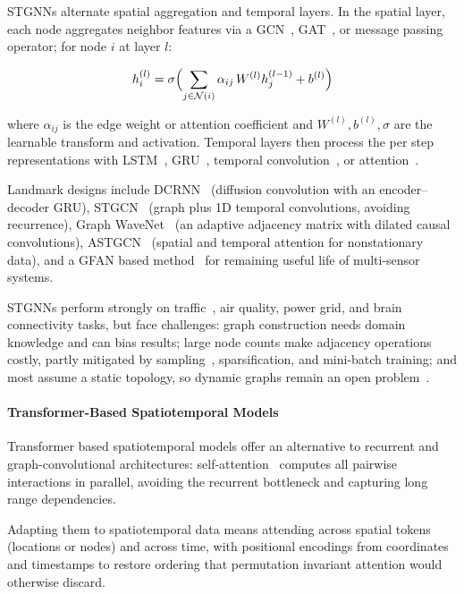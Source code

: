 \documentclass[journal]{IEEEtran}
\begin{document}
STGNNs alternate spatial aggregation and temporal layers. In the spatial layer, each node aggregates neighbor features via a GCN~\cite{kipf2017gcn}, GAT~\cite{velickovic2018gat}, or message passing operator; for node $i$ at layer $l$:
 
\begin{equation}
h_i^{(l)} = \sigma \Bigl( \sum_{j \in \mathcal{N}(i)} \alpha_{ij} \, W^{(l)} h_j^{(l-1)} + b^{(l)} \Bigr)
\end{equation}
 
where $\alpha_{ij}$ is the edge weight or attention coefficient and $W^{(l)},b^{(l)},\sigma$ are the learnable transform and activation. Temporal layers then process the per step representations with LSTM~\cite{rnn_lstm}, GRU~\cite{cho2014gru}, temporal convolution~\cite{lea2017temporal}, or attention~\cite{vaswani2017attention}.
 
Landmark designs include DCRNN~\cite{li2018dcrnn} (diffusion convolution with an encoder--decoder GRU), STGCN~\cite{yu2018spatio} (graph plus 1D temporal convolutions, avoiding recurrence), Graph WaveNet~\cite{wu2019graphwavenet} (an adaptive adjacency matrix with dilated causal convolutions), ASTGCN~\cite{guo2019astgcn} (spatial and temporal attention for nonstationary data), and a GFAN based method~\cite{wang2025rul} for remaining useful life of multi-sensor systems.
 
STGNNs perform strongly on traffic~\cite{yu2018spatio, li2018dcrnn}, air quality, power grid, and brain connectivity tasks, but face challenges: graph construction needs domain knowledge and can bias results; large node counts make adjacency operations costly, partly mitigated by sampling~\cite{hamilton2017inductive}, sparsification, and mini-batch training; and most assume a static topology, so dynamic graphs remain an open problem~\cite{pareja2020evolvegcn}.
 
\paragraph{Transformer-Based Spatiotemporal Models}
Transformer based spatiotemporal models offer an alternative to recurrent and graph-convolutional architectures: self-attention~\cite{vaswani2017attention} computes all pairwise interactions in parallel, avoiding the recurrent bottleneck and capturing long range dependencies.
 
Adapting them to spatiotemporal data means attending across spatial tokens (locations or nodes) and across time, with positional encodings from coordinates and timestamps to restore ordering that permutation invariant attention would otherwise discard.
 
\end{document}
